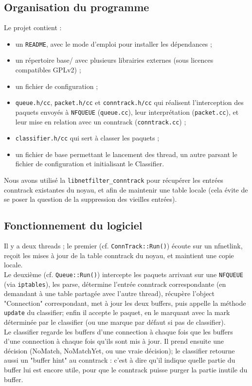 \subsection*{Organisation du programme}
Le projet contient :
\begin{itemize}
\item un \verb+README+, avec le mode d'emploi pour installer les dépendances ;
\item un répertoire base/ avec plusieurs librairies externes (sous
licences compatibles GPLv2) ;
\item un fichier de configuration ;
\item \verb+queue.h/cc+, \verb+packet.h/cc+ et \verb+conntrack.h/cc+ qui réalisent l'interception des paquets envoyés à \verb+NFQUEUE+ (\verb+queue.cc+), leur
interprétation (\verb+packet.cc+), et leur mise en relation avec un conntrack
(\verb+conntrack.cc+) ;
\item \verb+classifier.h/cc+ qui sert à classer les paquets ;
\item un fichier de base permettant le lancement des thread, un autre parsant le fichier de configuration et initialisant le Classifier.
\end{itemize}

Nous avons utilisé la \verb+libnetfilter_conntrack+ pour
récupérer les entrées conntrack existantes du noyau, et afin de maintenir une table locale (cela évite de se poser la question de
la suppression des vieilles entrées).

\subsection*{Fonctionnement du logiciel}
Il y a deux threads ; le premier (cf. \verb+ConnTrack::Run()+) écoute sur un
nfnetlink, reçoit les mises à jour de la table conntrack du noyau, et
maintient une copie locale.\\

Le deuxième (cf. \verb+Queue::Run()+) intercepte les paquets arrivant sur une
\verb+NFQUEUE+ (via \verb+iptables+), les parse, détermine l'entrée conntrack
correspondante (en demandant à une table partagée avec l'autre
thread), récupère l'object "Connection" correspondant, met à jour les
deux buffers, puis appelle la méthode \verb+update+ du classifier; enfin il
accepte le paquet, en le marquant avec la mark déterminée par le
classifier (ou une marque par défaut si pas de classifier).\\

Le classifier regarde les buffers d'une connection à chaque fois que les buffers d'une connection à chaque fois qu'ils sont mis à jour. Il prend ensuite une décision (NoMatch, NoMatchYet, ou une vraie décision); le classifier retourne aussi un "buffer hint" au conntrack : c'est à dire qu'il indique quelle
partie du buffer lui est encore utile, pour que le conntrack puisse
purger la partie inutile du buffer.\\




